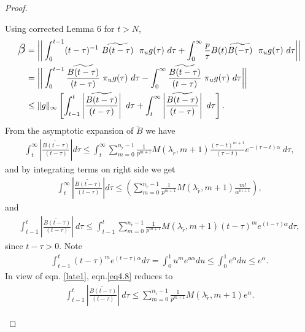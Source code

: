 \begin{proof}
\begin{enumerate}
Using corrected Lemma 6 for $t > N$,
\begin{align} 
	\nonumber\Scale[1.5]{\beta}&=\bigg|\bigg| \int_{0}^{t-1} (t-\tau)^{-1}~\widetilde{B(t-\tau)} ~~ \pi_ug(\tau) ~d\tau + \int_{0}^{\infty} \frac{p}{\tau} B(t) \widetilde{B(-\tau)} ~~ \pi_ug(\tau) ~d\tau \bigg|\bigg|\\ 
	\nonumber& = \bigg|\bigg| \int_{0}^{t-1} \frac{\widetilde{B(t-\tau)}}{(t-\tau)}~\pi_ug(\tau)~d\tau - \int_{0}^{\infty} \frac{\widetilde{B(t-\tau)}}{(t-\tau)}~\pi_ug(\tau)~d\tau\bigg|\bigg|\\
	&\leq \inorm{g} \left[ \int_{t-1}^{t}\left| \frac{\widetilde{B(t-\tau)}}{(t-\tau)}\right|~ d\tau + \int_{t}^{\infty}\left| \frac{\widetilde{B(t-\tau)}}{(t-\tau)}\right| ~d\tau\right]. \label{err3}
\end{align}
From the asymptotic expansion of $\widetilde{B}$ we have
\begin{align}
\int_{t}^{\infty}\left| \frac{\widetilde{B(t-\tau)}}{(t-\tau)}\right| d\tau	\leq  \int_{t}^{\infty} \sum_{m=0}^{n_{\tilde{r}} -1} \frac{1}{p^{m+1}} M(\lambda_{\tilde{r}},m+1) \frac{(\tau - t)^{m+1}}{(\tau-t)} e^{-(\tau -t) \alpha} ~d\tau,
\end{align} and by integrating terms on right side we get
\begin{align} \label{eq4.7}
\int_{t}^{\infty}\left| \frac{\widetilde{B(t-\tau)}}{(t-\tau)}\right| d\tau	\leq \left( \sum_{m=0}^{n_{\tilde{r}} -1} \frac{1}{p^{m+1}} M(\lambda_{\tilde{r}},m+1) \frac{m!}{\alpha^{m+1}}\right),
\end{align}
and
\begin{align}\label{eq4.8}
\int_{t-1}^{t}\left| \frac{\widetilde{B(t-\tau)}}{(t-\tau)}\right| ~d\tau	\leq \int_{t-1}^{t} \sum_{m=0}^{n_{\tilde{r}}-1} \frac{1}{p^{m+1}}M(\lambda_{\tilde{r}},m+1) (t-\tau)^{m} e^{(t-\tau)\alpha}d \tau,
\end{align}since $t-\tau >0$. Note							 
\begin{align} \label{late1}
\int_{t-1}^{t} (t-\tau)^m e^{(t-\tau)\alpha} d\tau = \int_{0}^{1} u^m e^{u \alpha} du \leq \int_{0}^{1} e^{\alpha} du \leq e^{\alpha}.
\end{align}
In view of eqn. \eqref{late1}, eqn.\eqref{eq4.8} reduces to
\begin{align} \label{eq4.9}
\int_{t-1}^{t}\left| \frac{\widetilde{B(t-\tau)}}{(t-\tau)}\right| ~d\tau	\leq \sum_{m=0}^{n_{\tilde{r}}-1} \frac{1}{p^{m+1}}M(\lambda_{\tilde{r}},m+1) e^{\alpha}.
\end{align}


\end{enumerate}
\end{proof}
